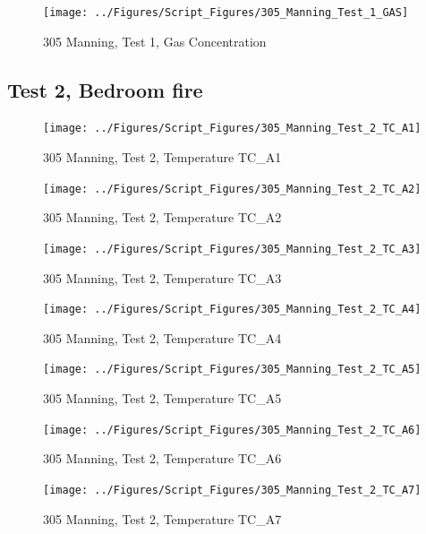 \documentclass[12pt,oneside]{book}
\begin{document}
\begin{figure}[!ht]
\texttt{[image: ../Figures/Script\_Figures/305\_Manning\_Test\_1\_GAS]}
\caption{305 Manning, Test 1, Gas Concentration}
\label{fig:305_Manning_Test_1_GAS}
\end{figure}


\clearpage


\subsection{Test 2, Bedroom fire}

\begin{figure}[!ht]
\texttt{[image: ../Figures/Script\_Figures/305\_Manning\_Test\_2\_TC\_A1]}
\caption{305 Manning, Test 2, Temperature TC\_A1}
\label{fig:305_Manning_Test_2_TC_A1}
\end{figure}

\begin{figure}[!ht]
\texttt{[image: ../Figures/Script\_Figures/305\_Manning\_Test\_2\_TC\_A2]}
\caption{305 Manning, Test 2, Temperature TC\_A2}
\label{fig:305_Manning_Test_2_TC_A2}
\end{figure}

\begin{figure}[!ht]
\texttt{[image: ../Figures/Script\_Figures/305\_Manning\_Test\_2\_TC\_A3]}
\caption{305 Manning, Test 2, Temperature TC\_A3}
\label{fig:305_Manning_Test_2_TC_A3}
\end{figure}

\begin{figure}[!ht]
\texttt{[image: ../Figures/Script\_Figures/305\_Manning\_Test\_2\_TC\_A4]}
\caption{305 Manning, Test 2, Temperature TC\_A4}
\label{fig:305_Manning_Test_2_TC_A4}
\end{figure}

\begin{figure}[!ht]
\texttt{[image: ../Figures/Script\_Figures/305\_Manning\_Test\_2\_TC\_A5]}
\caption{305 Manning, Test 2, Temperature TC\_A5}
\label{fig:305_Manning_Test_2_TC_A5}
\end{figure}

\begin{figure}[!ht]
\texttt{[image: ../Figures/Script\_Figures/305\_Manning\_Test\_2\_TC\_A6]}
\caption{305 Manning, Test 2, Temperature TC\_A6}
\label{fig:305_Manning_Test_2_TC_A6}
\end{figure}

\begin{figure}[!ht]
\texttt{[image: ../Figures/Script\_Figures/305\_Manning\_Test\_2\_TC\_A7]}
\caption{305 Manning, Test 2, Temperature TC\_A7}
\label{fig:305_Manning_Test_2_TC_A7}
\end{figure}
\end{document}
